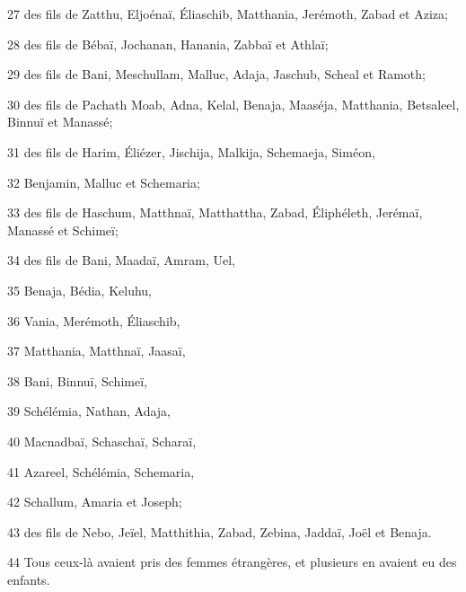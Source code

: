 \par 27 des fils de Zatthu, Eljoénaï, Éliaschib, Matthania, Jerémoth, Zabad et Aziza;
\par 28 des fils de Bébaï, Jochanan, Hanania, Zabbaï et Athlaï;
\par 29 des fils de Bani, Meschullam, Malluc, Adaja, Jaschub, Scheal et Ramoth;
\par 30 des fils de Pachath Moab, Adna, Kelal, Benaja, Maaséja, Matthania, Betsaleel, Binnuï et Manassé;
\par 31 des fils de Harim, Éliézer, Jischija, Malkija, Schemaeja, Siméon,
\par 32 Benjamin, Malluc et Schemaria;
\par 33 des fils de Haschum, Matthnaï, Matthattha, Zabad, Éliphéleth, Jerémaï, Manassé et Schimeï;
\par 34 des fils de Bani, Maadaï, Amram, Uel,
\par 35 Benaja, Bédia, Keluhu,
\par 36 Vania, Merémoth, Éliaschib,
\par 37 Matthania, Matthnaï, Jaasaï,
\par 38 Bani, Binnuï, Schimeï,
\par 39 Schélémia, Nathan, Adaja,
\par 40 Macnadbaï, Schaschaï, Scharaï,
\par 41 Azareel, Schélémia, Schemaria,
\par 42 Schallum, Amaria et Joseph;
\par 43 des fils de Nebo, Jeïel, Matthithia, Zabad, Zebina, Jaddaï, Joël et Benaja.
\par 44 Tous ceux-là avaient pris des femmes étrangères, et plusieurs en avaient eu des enfants.


